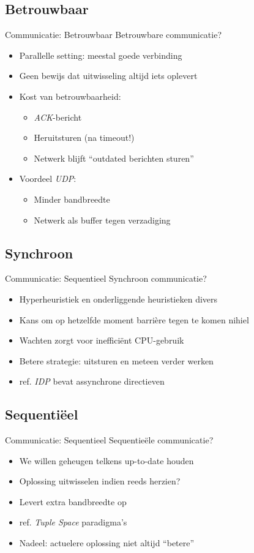 \documentclass{beamer}
\begin{document}
\subsection{Betrouwbaar}
\begin{frame}{Communicatie: Betrouwbaar}
Betrouwbare communicatie?
\begin{itemize}
 \item Parallelle setting: meestal goede verbinding
 \item Geen bewijs dat uitwisseling altijd iets oplevert
 \item Kost van betrouwbaarheid:
 \begin{itemize}
  \item \emph{ACK}-bericht
  \item Heruitsturen (na timeout!)
  \item Netwerk blijft ``outdated berichten sturen''
 \end{itemize}
 \item Voordeel \emph{UDP}:
 \begin{itemize}
  \item Minder bandbreedte
  \item Netwerk als buffer tegen verzadiging
 \end{itemize}
\end{itemize}
\end{frame}
\subsection{Synchroon}
\begin{frame}{Communicatie: Sequentieel}
Synchroon communicatie?
\begin{itemize}
 \item Hyperheuristiek en onderliggende heuristieken divers
 \item Kans om op hetzelfde moment barri\`ere tegen te komen nihiel
 \item Wachten zorgt voor ineffici\"ent CPU-gebruik
 \item Betere strategie: uitsturen en meteen verder werken
 \item ref. \emph{IDP} bevat assynchrone directieven
\end{itemize}
\end{frame}
\subsection{Sequenti\"eel}
\begin{frame}{Communicatie: Sequentieel}
Sequentie\"ele communicatie?
\begin{itemize}
 \item We willen geheugen telkens up-to-date houden
 \item Oplossing uitwisselen indien reeds herzien?
 \item Levert extra bandbreedte op
 \item ref. \emph{Tuple Space} paradigma's
 \item Nadeel: actuelere oplossing niet altijd ``betere''
\end{itemize}
\end{frame}
\end{document}

